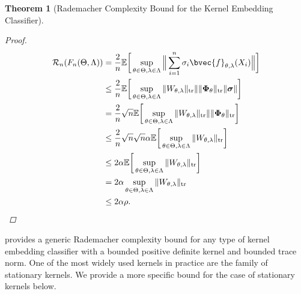 \documentclass{article}
\newtheorem{theorem}{Theorem}[section]
\begin{document}
\begin{theorem}[Rademacher Complexity Bound for the Kernel Embedding Classifier]
\begin{proof}
				\begin{equation}
					\begin{aligned}
						\mathcal{R}_{n}(F_{n}(\Theta, \Lambda)) &= \frac{2}{n} \mathbb{E}\bigg[\sup_{\theta \in \Theta, \lambda \in \Lambda} \Big\| \sum_{i = 1}^{n} \sigma_{i}\bvec{f}_{\theta, \lambda}(X_{i}) \Big\|\bigg] \\
						&\leq \frac{2}{n} \mathbb{E}\bigg[\sup_{\theta \in \Theta, \lambda \in \Lambda} \|  W_{\theta, \lambda} \|_{\mathrm{tr}} \| \| \bm{\Phi}_{\theta} \|_{\mathrm{tr}} \| \bm{\sigma} \| \bigg] \\
						&= \frac{2}{n} \sqrt{n} \mathbb{E}\bigg[\sup_{\theta \in \Theta, \lambda \in \Lambda} \|  W_{\theta, \lambda} \|_{\mathrm{tr}} \| \| \bm{\Phi}_{\theta} \|_{\mathrm{tr}} \bigg] \\
						&\leq \frac{2}{n} \sqrt{n} \sqrt{n} \alpha \mathbb{E}\bigg[\sup_{\theta \in \Theta, \lambda \in \Lambda} \|  W_{\theta, \lambda} \|_{\mathrm{tr}} \bigg] \\
						&\leq 2 \alpha \mathbb{E}\bigg[\sup_{\theta \in \Theta, \lambda \in \Lambda} \|  W_{\theta, \lambda} \|_{\mathrm{tr}} \bigg] \\
						&= 2 \alpha \sup_{\theta \in \Theta, \lambda \in \Lambda} \|  W_{\theta, \lambda} \|_{\mathrm{tr}} \\
						&\leq 2 \alpha \rho.
					\end{aligned}
				\end{equation}
			\end{proof}
		\end{theorem}
	
		 provides a generic Rademacher complexity bound for any type of kernel embedding classifier with a bounded positive definite kernel and bounded trace norm. One of the most widely used kernels in practice are the family of stationary kernels. We provide a more specific bound for the case of stationary kernels below.
		
\end{document}
